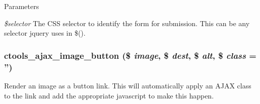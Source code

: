 \begin{DoxyParams}{Parameters}
\item[{\em \$selector}]The CSS selector to identify the form for submission. This can be any selector jquery uses in \$(). \end{DoxyParams}
\hypertarget{ctools_2includes_2ajax_8inc_a00499a965fd0a192af2106a400c0e140}{
\subsubsection[{ctools\_\-ajax\_\-image\_\-button}]{\setlength{\rightskip}{0pt plus 5cm}ctools\_\-ajax\_\-image\_\-button (\$ {\em image}, \/  \$ {\em dest}, \/  \$ {\em alt}, \/  \$ {\em class} = {\ttfamily ''})}}
\label{ctools_2includes_2ajax_8inc_a00499a965fd0a192af2106a400c0e140}
Render an image as a button link. This will automatically apply an AJAX class to the link and add the appropriate javascript to make this happen.


